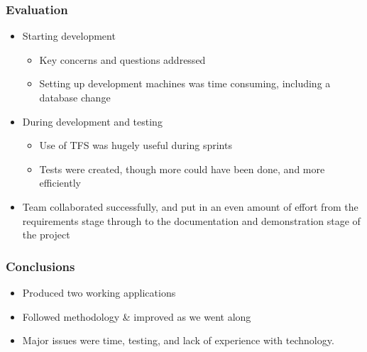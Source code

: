 \documentclass[10pt, compress]{beamer}
\begin{document}

\begin{frame}[fragile]
\frametitle{Evaluation}

\begin{itemize}
	\item Starting development
		\begin{itemize}
			\item Key concerns and questions addressed
			\item Setting up development machines was time consuming, including a database change
		\end{itemize}
	\item During development and testing
		\begin{itemize}
			\item Use of TFS was hugely useful during sprints
			\item Tests were created, though more could have been done, and more efficiently
		\end{itemize}
	\item Team collaborated successfully, and put in an even amount of effort from the requirements stage through to the documentation and demonstration stage of the project
\end{itemize}
\end{frame}

\begin{frame}[fragile]
  \frametitle{Conclusions}
  
  	\begin{itemize}
		\item Produced two working applications
		\item Followed methodology \& improved as we went along
		\item Major issues were time, testing, and lack of experience with technology.
	\end{itemize}

\end{frame}


\end{document}
